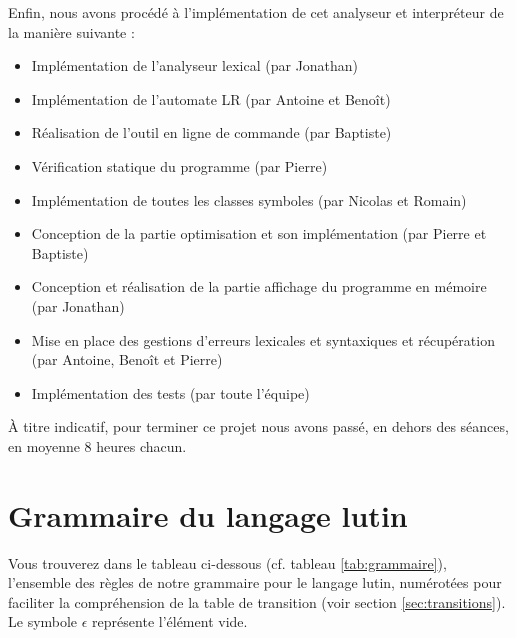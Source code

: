 Enfin, nous avons procédé à l'implémentation de cet analyseur et interpréteur de la manière suivante :
\begin{itemize}
	\item Implémentation de l'analyseur lexical (par Jonathan)
	\item Implémentation de l'automate LR (par Antoine et Benoît)
	\item Réalisation de l'outil en ligne de commande (par Baptiste)
	\item Vérification statique du programme (par Pierre)
	\item Implémentation de toutes les classes symboles (par Nicolas et Romain)
	\item Conception de la partie optimisation et son implémentation (par Pierre et Baptiste)
	\item Conception et réalisation de la partie affichage du programme en mémoire (par Jonathan)
	\item Mise en place des gestions d'erreurs lexicales et syntaxiques et récupération (par Antoine, Benoît et Pierre)
	\item Implémentation des tests (par toute l'équipe)\\
\end{itemize}

À titre indicatif, pour terminer ce projet nous avons passé, en dehors des séances, en moyenne 8 heures chacun.

\newpage

\section{Grammaire du langage lutin}
\label{sec:grammaire}

Vous trouverez dans le tableau ci-dessous (cf. tableau \ref{tab:grammaire}), l'ensemble des règles de notre grammaire pour le langage lutin, numérotées pour faciliter la compréhension de la table de transition (voir section \ref{sec:transitions}). Le symbole $\epsilon$ représente l’élément vide.


